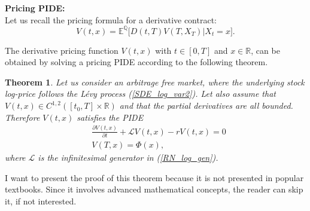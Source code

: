 \documentclass[a4paper,10pt]{article}
\newcommand{\numberset}{\mathbb}
\newcommand{\R}{\numberset{R}}
\newcommand{\E}{\numberset{E}}
\newcommand{\Q}{\numberset{Q}}
\newcommand{\LL}{\mathcal{L}}
\newtheorem{Theorem}{Theorem}[section]
\begin{document}
\noindent
\textbf{Pricing PIDE:}\\
Let us recall the pricing formula for a derivative contract:
 \begin{equation}\label{derivative_price}
  V(t,x) = \E^{\Q}  \biggl[ D(t,T) V(T,X_T) \bigg| X_t = x \biggr] . 
 \end{equation}

The derivative pricing function $V(t,x)$ with $t \in [0,T]$ and $x \in \R$, can be obtained by solving a pricing PIDE according to the following theorem.
\begin{Theorem}
 Let us consider an arbitrage free market, where the underlying stock log-price follows the Lévy process (\ref{SDE_log_var2}). 
 Let also assume that $V(t,x) \in C^{1,2}([t_0,T] \times \R)$ and that the partial derivatives are all bounded.
 Therefore $V(t,x)$ satisfies the PIDE
\begin{align}\label{derivative_PIDE}
 & \frac{\partial V(t,x)}{\partial t} + \LL V(t,x) -r V(t,x) = 0 \\
 & V(T,x) = \Phi(x),
\end{align}
where $\LL$ is the infinitesimal generator in (\ref{RN_log_gen}). 
\end{Theorem}
I want to present the proof of this theorem because it is not presented in popular textbooks. 
Since it involves advanced mathematical concepts, the reader can skip it, if not interested.
\end{document}
